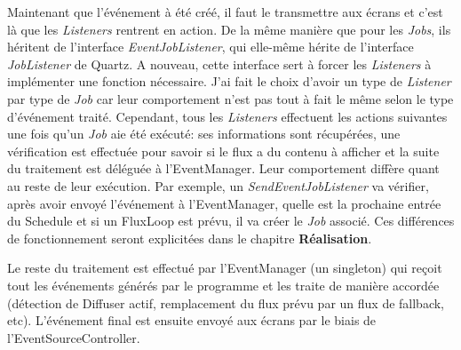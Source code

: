\documentclass[french]{article}
\begin{document}
Maintenant que l'événement à été créé, il faut le transmettre aux écrans et c'est là que les \textit{Listeners} rentrent en action. De la même manière que pour les \textit{Jobs}, ils héritent de l'interface \textit{EventJobListener}, qui elle-même hérite de l'interface \textit{JobListener} de Quartz. A nouveau, cette interface sert à forcer les \textit{Listeners} à implémenter une fonction nécessaire. J'ai fait le choix d'avoir un type de \textit{Listener} par type de \textit{Job} car leur comportement n'est pas tout à fait le même selon le type d'événement traité. \newline
Cependant, tous les \textit{Listeners} effectuent les actions suivantes une fois qu'un \textit{Job} aie été exécuté:
ses informations sont récupérées, une vérification est effectuée pour savoir si le flux a du contenu à afficher et la suite du traitement est déléguée à l'EventManager. Leur comportement diffère quant au reste de leur exécution. Par exemple, un \textit{SendEventJobListener} va vérifier, après avoir envoyé l'événement à l'EventManager, quelle est la prochaine entrée du Schedule et si un FluxLoop est prévu, il va créer le \textit{Job} associé. Ces différences de fonctionnement seront explicitées dans le chapitre \textbf{Réalisation}. \newline

Le reste du traitement est effectué par l'EventManager (un singleton) qui reçoit tout les événements générés par le programme et les traite de manière accordée (détection de Diffuser actif, remplacement du flux prévu par un flux de fallback, etc). L'événement final est ensuite envoyé aux écrans par le biais de l'EventSourceController.
\end{document}
